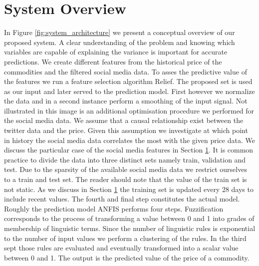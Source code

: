 \section{System Overview}

In Figure \ref{fig:system_architecture} we present a conceptual overview of our proposed system.  A clear understanding of the problem and knowing which variables are capable of explaining the variance is important for accurate predictions. We create different features from the historical price of the commodities and the filtered social media data. To asses the predictive value of the features we run a feature selection algorithm Relief. The proposed set is used as our input and later served to the prediction model. First however we normalize the data and in a second instance perform a smoothing of the input signal. Not illustrated in this image is an additional optimisation procedure we performed for the social media data. We assume that a causal relationship exist between the twitter data and the price. Given this assumption we investigate at which point in history the social media data correlates the most with the given price data. We discuss the particular case of the social media features in Section \ref{}. It is common practice to divide the data into three distinct sets namely train, validation and test. Due to the sparsity of the available social media data we restrict ourselves to a train and test set. The reader should note that the value of the train set is not static. As we discuss in Section \ref{} the training set is updated every 28 days to include recent values. The fourth and final step constitutes the actual model.  Roughly the prediction model ANFIS performs four steps. Fuzzification corresponds to the process of transforming a value between 0 and 1 into grades of membership of linguistic terms. Since the number of linguistic rules is exponential to the number of input values we perform a clustering of the rules. In the third sept those rules are evaluated and eventually transformed into a scalar value between 0 and 1. The output is the predicted value of the price of a commodity. 





